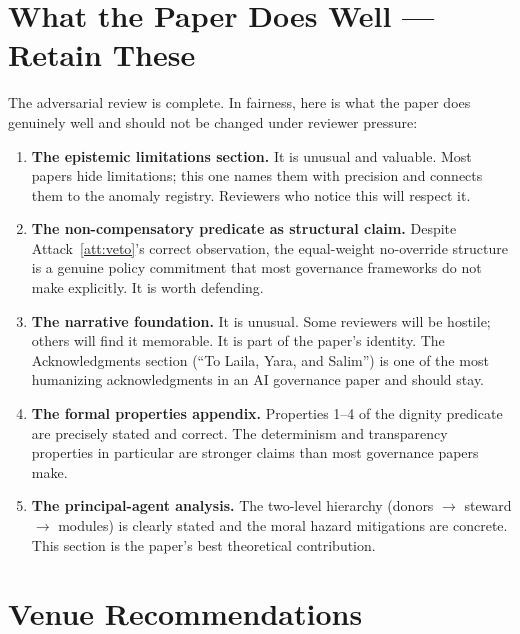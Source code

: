 \documentclass[12pt,a4paper]{article}
\theoremstyle{definition}
\begin{document}
\section{What the Paper Does Well — Retain These}

The adversarial review is complete. In fairness, here is what the paper does
genuinely well and should not be changed under reviewer pressure:

\begin{enumerate}
\item \textbf{The epistemic limitations section.} It is unusual and valuable.
  Most papers hide limitations; this one names them with precision and
  connects them to the anomaly registry. Reviewers who notice this will
  respect it.

\item \textbf{The non-compensatory predicate as structural claim.} Despite
  Attack~\ref{att:veto}'s correct observation, the equal-weight no-override
  structure is a genuine policy commitment that most governance frameworks
  do not make explicitly. It is worth defending.

\item \textbf{The narrative foundation.} It is unusual. Some reviewers will
  be hostile; others will find it memorable. It is part of the paper's
  identity. The Acknowledgments section (``To Laila, Yara, and Salim'') is
  one of the most humanizing acknowledgments in an AI governance paper and
  should stay.

\item \textbf{The formal properties appendix.} Properties 1--4 of the
  dignity predicate are precisely stated and correct. The determinism and
  transparency properties in particular are stronger claims than most
  governance papers make.

\item \textbf{The principal-agent analysis.} The two-level hierarchy
  (donors $\to$ steward $\to$ modules) is clearly stated and the moral
  hazard mitigations are concrete. This section is the paper's best
  theoretical contribution.
\end{enumerate}

\section{Venue Recommendations}
\end{document}

